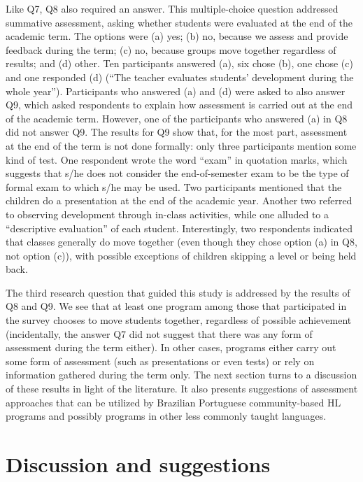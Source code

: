 \documentclass[output=paper]{langscibook}
\begin{document}
Like Q7, Q8 also required an answer. This multiple-choice question addressed summative assessment, asking whether students were evaluated at the end of the academic term. The options were (a) yes; (b) no, because we assess and provide feedback during the term; (c) no, because groups move together regardless of results; and (d) other. Ten participants answered (a), six chose (b), one chose (c) and one responded (d) (“The teacher evaluates students’ development during the whole year”). Participants who answered (a) and (d) were asked to also answer Q9, which asked respondents to explain how assessment is carried out at the end of the academic term. However, one of the participants who answered (a) in Q8 did not answer Q9. The results for Q9 show that, for the most part, assessment at the end of the term is not done formally: only three participants mention some kind of test. One respondent wrote the word “exam” in quotation marks, which suggests that s/he does not consider the end-of-semester exam to be the type of formal exam to which s/he may be used. Two participants mentioned that the children do a presentation at the end of the academic year. Another two referred to observing development through in-class activities, while one alluded to a “descriptive evaluation” of each student. Interestingly, two respondents indicated that classes generally do move together (even though they chose option (a) in Q8, not option (c)), with possible exceptions of children skipping a level or being held back.

The third research question that guided this study is addressed by the results of Q8 and Q9. We see that at least one program among those that participated in the survey chooses to move students together, regardless of possible achievement (incidentally, the answer Q7 did not suggest that there was any form of assessment during the term either). In other cases, programs either carry out some form of assessment (such as presentations or even tests) or rely on information gathered during the term only. The next section turns to a discussion of these results in light of the literature. It also presents suggestions of assessment approaches that can be utilized by Brazilian Portuguese community-based HL programs and possibly programs in other less commonly taught languages.

\section{Discussion and suggestions}\label{sec:6:6}
\end{document}
